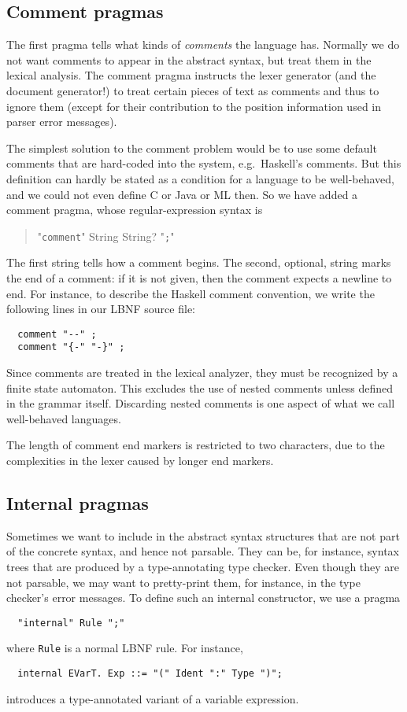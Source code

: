 \documentclass[10pt]{article}
\newcommand{\bequ}{\begin{quote}}
\newcommand{\enqu}{\end{quote}}
\begin{document}
\subsection{Comment pragmas}

The first pragma tells what kinds of \textit{comments} the language has.
Normally we do not want comments to appear in the abstract syntax,
but treat them in the lexical analysis. The comment pragma instructs the
lexer generator (and the document generator!) to
treat certain pieces of text as comments and thus to ignore them
(except for their contribution to the position information used in
parser error messages).

The simplest solution to the comment 
problem would be to use some default comments 
that are hard-coded into the system, e.g.\ Haskell's comments.
But this definition can hardly be stated as a condition for a language
to be well-behaved, and we could not even
define C or Java or ML then. So we have added a comment pragma, whose 
regular-expression syntax is
\bequ
  "{\tt comment}" String String? "{\tt ;}"
\enqu
The first string tells how a comment begins.
The second, optional, string marks the end of a comment:
if it is not given, then the comment expects a newline to end.
For instance, to describe the Haskell comment convention,
we write the following lines in our LBNF source file:
\begin{verbatim}
  comment "--" ;
  comment "{-" "-}" ; 
\end{verbatim}
Since comments are treated in the lexical analyzer, they must
be recognized by a finite state automaton.
This excludes the use of nested comments unless defined in
the grammar itself. Discarding nested comments is one aspect
of what we call well-behaved languages.

The length of comment end markers is restricted to two characters,
due to the complexities in the lexer caused by longer end markers.



\subsection{Internal pragmas}

Sometimes we want to include in the abstract syntax 
structures that are not part of the concrete syntax, 
and hence not parsable. 
They can be, for instance, syntax trees that are produced by a 
type-annotating type checker.
Even though they are not parsable, we may want to
pretty-print them, for instance, in the type checker's
error messages.
To define such an internal constructor, we use a pragma
\begin{verbatim}
  "internal" Rule ";"
\end{verbatim}
where {\tt Rule} is a normal LBNF rule. For instance,
\begin{verbatim}
  internal EVarT. Exp ::= "(" Ident ":" Type ")";
\end{verbatim}
introduces a type-annotated variant of a variable expression.
\end{document}
